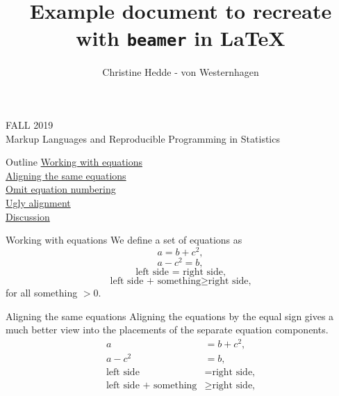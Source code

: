 \documentclass[11pt, aspectratio=169]{beamer}
\title{Example document to recreate with \texttt{beamer} in \LaTeX}
\author{Christine Hedde - von Westernhagen}
\date{}
\begin{document}
\begin{frame}[plain]
  \titlepage
  \vspace{\fill}
  \centering FALL 2019\\Markup Languages and Reproducible Programming in Statistics
\end{frame}


\begin{frame}{Outline}
    \hyperlink{working}{Working with equations} \\
    \hspace{5mm} \hyperlink{aligning}{Aligning the same equations} \\
    \hspace{5mm} \hyperlink{omit}{Omit equation numbering} \\
    \hspace{5mm} \hyperlink{ugly}{Ugly alignment} \\
    \vspace{10mm}
    \hyperlink{discussion}{Discussion}
\end{frame}


\begin{frame}[label=working]{Working with equations}
    We define a set of equations as
    \begin{equation} a = b + c^2, \end{equation}
    \begin{equation} a - c^2 = b, \end{equation}
    \begin{equation} \text{left side = right side,} \end{equation}
    \begin{equation} \text{left side + something} \geq \text{right side,} \end{equation}
    for all something $> 0$.
\end{frame}


\begin{frame}[label=aligning]{Aligning the same equations}
    Aligning the equations by the equal sign gives a much better view into the placements of the separate equation components.
    \begin{align}
        a &= b + c^2, \\
        a - c^2 &= b, \\
        \text{left side} &= \text{right side,} \\
        \text{left side + something} &\geq \text{right side,}
    \end{align}
\end{frame}
\end{document}
